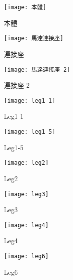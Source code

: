 \begin{figure}[htbp]
  \begin{minipage}[t]{0.3\linewidth}
    \centering
    \texttt{[image: 本體]}
    \caption{本體}
    \label{本體}
  \end{minipage}
  \hfill
  \begin{minipage}[t]{0.3\linewidth}
    \centering
    \texttt{[image: 馬達連接座]}
    \caption{連接座}
    \label{馬達連接座}
  \end{minipage}
  \hfill
  \begin{minipage}[t]{0.3\linewidth}
    \centering
    \texttt{[image: 馬達連接座-2]}
    \caption{連接座-2}
    \label{馬達連接座-2}
  \end{minipage}
\end{figure}

\begin{figure}[htbp]
  \begin{minipage}[t]{0.3\linewidth}
    \centering
    \texttt{[image: leg1-1]}
    \caption{Leg1-1}
    \label{leg1-1}
  \end{minipage}
  \hfill
  \begin{minipage}[t]{0.3\linewidth}
    \centering
    \texttt{[image: leg1-5]}
    \caption{Leg1-5}
    \label{leg1-5}
  \end{minipage}
  \hfill
  \begin{minipage}[t]{0.3\linewidth}
    \centering
    \texttt{[image: leg2]}
    \caption{Leg2}
    \label{leg2}
  \end{minipage}
\end{figure}

\begin{figure}[htbp]
  \begin{minipage}[t]{0.3\linewidth}
    \centering
    \texttt{[image: leg3]}
    \caption{Leg3}
    \label{leg3}
  \end{minipage}
  \hfill
  \begin{minipage}[t]{0.3\linewidth}
    \centering
    \texttt{[image: leg4]}
    \caption{Leg4}
    \label{leg4}
  \end{minipage}
  \hfill
  \begin{minipage}[t]{0.3\linewidth}
    \centering
    \texttt{[image: leg6]}
    \caption{Leg6}
    \label{leg6}
  \end{minipage}
\end{figure}

